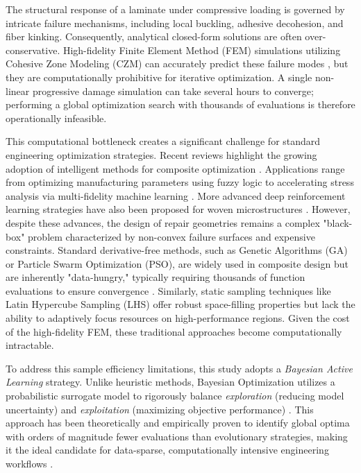 \documentclass[
  preprint,
  12pt,
  a4paper
]{elsarticle}
\begin{document}
The structural response of a laminate under compressive loading is governed by intricate failure mechanisms, including local buckling, adhesive decohesion, and fiber kinking. Consequently, analytical closed-form solutions are often over-conservative. High-fidelity Finite Element Method (FEM) simulations utilizing Cohesive Zone Modeling (CZM) can accurately predict these failure modes \cite{turon2007engineering, alfano2001finite}, but they are computationally prohibitive for iterative optimization. A single non-linear progressive damage simulation can take several hours to converge; performing a global optimization search with thousands of evaluations is therefore operationally infeasible.

This computational bottleneck creates a significant challenge for standard engineering optimization strategies. Recent reviews highlight the growing adoption of intelligent methods for composite optimization \cite{chen2023intelligent}. Applications range from optimizing manufacturing parameters using fuzzy logic \cite{babu2021artificial} to accelerating stress analysis via multi-fidelity machine learning \cite{azeem2024machine}. More advanced deep reinforcement learning strategies have also been proposed for woven microstructures \cite{hsu2025ai}. However, despite these advances, the design of repair geometries remains a complex "black-box" problem characterized by non-convex failure surfaces and expensive constraints. Standard derivative-free methods, such as Genetic Algorithms (GA) or Particle Swarm Optimization (PSO), are widely used in composite design but are inherently "data-hungry," typically requiring thousands of function evaluations to ensure convergence \cite{deb2002fast, queipo2005surrogate}. Similarly, static sampling techniques like Latin Hypercube Sampling (LHS) offer robust space-filling properties \cite{mckay1979comparison} but lack the ability to adaptively focus resources on high-performance regions. Given the cost of the high-fidelity FEM, these traditional approaches become computationally intractable.

To address this sample efficiency limitations, this study adopts a \textit{Bayesian Active Learning} strategy. Unlike heuristic methods, Bayesian Optimization utilizes a probabilistic surrogate model to rigorously balance \textit{exploration} (reducing model uncertainty) and \textit{exploitation} (maximizing objective performance) \cite{shahriari2015taking}. This approach has been theoretically and empirically proven to identify global optima with orders of magnitude fewer evaluations than evolutionary strategies, making it the ideal candidate for data-sparse, computationally intensive engineering workflows \cite{jones1998efficient, ghosh2023digital}.
\end{document}
